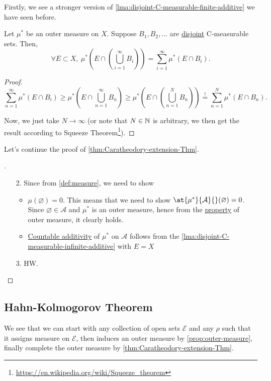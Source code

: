 Firstly, we see a stronger version of \autoref{lma:disjoint-C-measurable-finite-additive} we have seen before.
\begin{lemma}\label{lma:disjoint-C-measurable-infinite-additive}
	Let \(\mu^{*} \) be an outer measure on \(X\). Suppose \(B_1, B_2, \ldots\) are \underline{disjoint} C-measurable sets.
	Then,
	\[
		\forall E\subset X,\ \mu^{*} \left(E\cap \left(\bigcup\limits_{i=1}^{\infty} B_{i}\right)\right) = \sum\limits_{i=1}^{\infty} \mu^{*} \left(E\cap B_i\right).
	\]
\end{lemma}
\begin{proof}
	\[
		\sum\limits_{n=1}^{\infty} \mu^{*} (E\cap B_{i}) \geq \mu^{*} \left(E\cap \bigcup\limits_{n=1}^{\infty} B_{n}\right) \geq\mu^{*} \left(E\cap \left(\bigcup\limits_{n=1}^{N} B_{n}\right)\right) \overset{\hyperref[lma:disjoint-C-measurable-finite-additive]{!}}{=} \sum\limits_{n=1}^{N} \mu^{*} \left(E\cap B_n\right).
	\]

	Now, we just take \(N\to \infty \) (or note that \(N\in\mathbb{\MakeUppercase{N}} \) is arbitrary, we then get the result according to
	Squeeze Theorem\footnote{\url{https://en.wikipedia.org/wiki/Squeeze_theorem}}).
\end{proof}
Let's continue the proof of \autoref{thm:Caratheodory-extension-Thm}.
\begin{proof}[\unskip\nopunct]\label{pf:Caratheodory-extension-Thm-cont}
	\begin{enumerate}
		\item[2.] Since from \autoref{def:measure}, we need to show
			\begin{itemize}
				\item \(\mu (\varnothing ) = 0\). This means that we need to show \(\at{\mu^{*} }{\mathcal{A}}{}(\varnothing ) = 0\). Since \(\varnothing \in \mathcal{A} \) and \(\mu^{*}\) is
				      an outer measure, hence from the \hyperref[def:outer-measure-empty-measure]{property} of outer measure, it clearly holds.
				\item \hyperref[def:measure-countable-additivity]{Countable additivity} of \(\mu^{*} \) on \(\mathcal{A}\) follows from the \autoref{lma:disjoint-C-measurable-infinite-additive} with \(E = X\)
			\end{itemize}
		\item[3.] HW.
	\end{enumerate}
\end{proof}

\subsection{Hahn-Kolmogorov Theorem}
We see that we can start with any collection of open sets \(\mathcal{E}\) and any \(\rho\) such that it assigns measure on \(\mathcal{E}\), then induces an outer measure by \autoref{prop:outer-measure},
finally complete the outer measure by \autoref{thm:Caratheodory-extension-Thm}.

